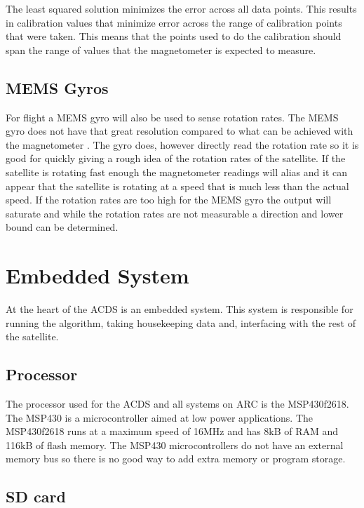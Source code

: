 The least squared solution minimizes the error across all data points. This results in calibration values that minimize error across the range of calibration points that were taken. This means that the points used to do the calibration should span the range of values that the magnetometer is expected to measure. 

\subsection{\acs{MEMS} Gyros}

For flight a \ac{MEMS} gyro will also be used to sense rotation rates. The \ac{MEMS} gyro does not have that great resolution compared to what can be achieved with the magnetometer . The gyro does, however directly read the rotation rate so it is good for quickly giving a rough idea of the rotation rates of the satellite. If the satellite is rotating fast enough the magnetometer readings will alias and it can appear that the satellite is rotating at a speed that is much less than the actual speed. If the rotation rates are too high for the \ac{MEMS} gyro the output will saturate and while the rotation rates are not measurable a direction and lower bound can be determined.


\section{Embedded System}

At the heart of the \ac{ACDS} is an embedded system. This system is responsible for running the algorithm, taking housekeeping data and, interfacing with the rest of the satellite.

\subsection{Processor}

The processor used for the \ac{ACDS} and all systems on \ac{ARC} is the MSP430f2618. The MSP430 is a microcontroller aimed at low power applications. The MSP430f2618 runs at a maximum speed of 16MHz and has 8kB of RAM and 116kB of flash memory. The MSP430 microcontrollers do not have an external memory bus so there is no good way to add extra memory or program storage. 

\subsection{SD card}

